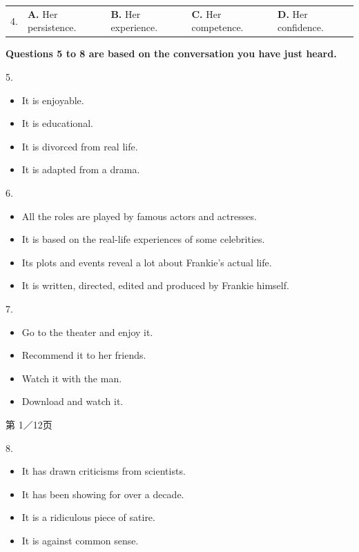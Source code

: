 \documentclass[UTF8,11pt]{ctexart}
\begin{document}
\noindent\begin{tabularx}{\linewidth}{@{}lXXXX@{}}4. & \textbf{A.} Her persistence. & \textbf{B.} Her experience. & \textbf{C.} Her competence. & \textbf{D.} Her confidence.\\\end{tabularx}\par

\textbf{Questions 5 to 8 are based on the conversation you have just heard.}


5.


\begin{itemize}[leftmargin=2em,itemsep=.2em,topsep=.4em]\item[A.] It is enjoyable.
\item[B.] It is educational.
\item[C.] It is divorced from real life.
\item[D.] It is adapted from a drama.
\end{itemize}

6.


\begin{itemize}[leftmargin=2em,itemsep=.2em,topsep=.4em]\item[A.] All the roles are played by famous actors and actresses.
\item[B.] It is based on the real-life experiences of some celebrities.
\item[C.] Its plots and events reveal a lot about Frankie's actual life.
\item[D.] It is written, directed, edited and produced by Frankie himself.
\end{itemize}

7.


\begin{itemize}[leftmargin=2em,itemsep=.2em,topsep=.4em]\item[A.] Go to the theater and enjoy it.
\item[B.] Recommend it to her friends.
\item[C.] Watch it with the man.
\item[D.] Download and watch it.
\end{itemize}

第 1／12页


8.


\begin{itemize}[leftmargin=2em,itemsep=.2em,topsep=.4em]\item[A.] It has drawn criticisms from scientists.
\item[B.] It has been showing for over a decade.
\item[C.] It is a ridiculous piece of satire.
\item[D.] It is against common sense.
\end{itemize}
\end{document}
